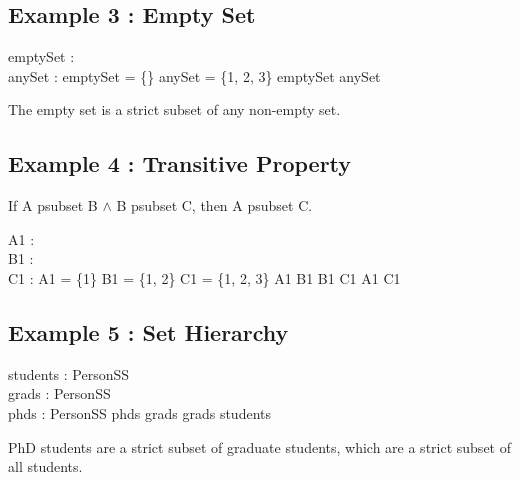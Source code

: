 \documentclass[a4paper,10pt,fleqn]{article}
\begin{document}
\subsection*{Example 3 : Empty Set}

\begin{axdef}
emptySet : \power \nat \\
anySet : \power \nat
\where
emptySet = \{\} \land anySet = \{1, 2, 3\} \land emptySet \subset anySet
\end{axdef}

\noindent The empty set is a strict subset of any non-empty set.

\bigskip

\subsection*{Example 4 : Transitive Property}

\noindent If A psubset B $\land$ B psubset C, then A psubset C.

\bigskip

\begin{axdef}
A1 : \power \nat \\
B1 : \power \nat \\
C1 : \power \nat
\where
A1 = \{1\} \land B1 = \{1, 2\} \land C1 = \{1, 2, 3\} \land A1 \subset B1 \land B1 \subset C1 \land A1 \subset C1
\end{axdef}

\subsection*{Example 5 : Set Hierarchy}

\begin{zed}[PersonSS]\end{zed}

\begin{axdef}
students : \power PersonSS \\
grads : \power PersonSS \\
phds : \power PersonSS
\where
phds \subset grads \land grads \subset students
\end{axdef}

\noindent PhD students are a strict subset of graduate students, which are a strict subset of all students.

\bigskip
\end{document}

